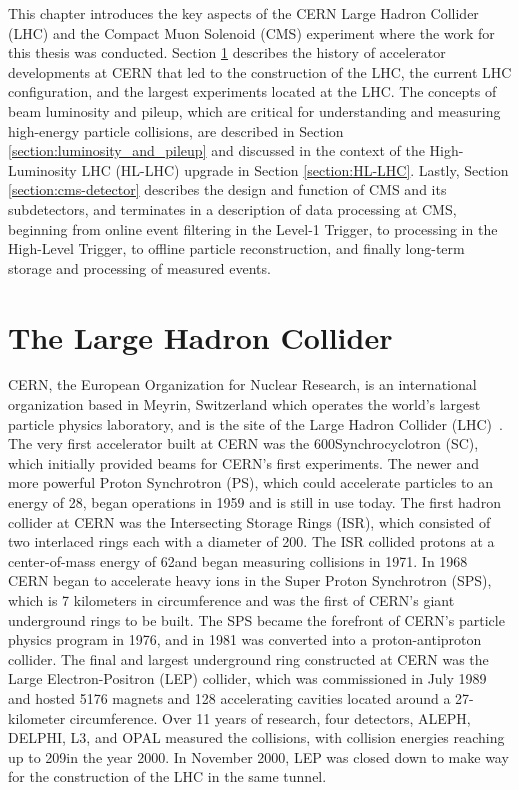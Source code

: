 This chapter introduces the key aspects of the CERN Large Hadron Collider (LHC) and the Compact Muon Solenoid (CMS) experiment where the work for this thesis was conducted. Section \ref{section:LHC} describes the history of accelerator developments at CERN that led to the construction of the LHC, the current LHC configuration, and the largest experiments located at the LHC. The concepts of beam luminosity and pileup, which are critical for understanding and measuring high-energy particle collisions, are described in Section \ref{section:luminosity_and_pileup} and discussed in the context of the High-Luminosity LHC (HL-LHC) upgrade in Section \ref{section:HL-LHC}. Lastly, Section \ref{section:cms-detector} describes the design and function of CMS and its subdetectors, and terminates in a description of data processing at CMS, beginning from online event filtering in the Level-1 Trigger, to processing in the High-Level Trigger, to offline particle reconstruction, and finally long-term storage and processing of measured events.

\section{The Large Hadron Collider}
\label{section:LHC}
CERN, the European Organization for Nuclear Research, is an international organization based in Meyrin, Switzerland which operates the world's largest particle physics laboratory, and is the site of the Large Hadron Collider (LHC)~\cite{history_of_CERN}. The very first accelerator built at CERN was the 600\MeV Synchrocyclotron (SC), which initially provided beams for CERN's first experiments. The newer and more powerful Proton Synchrotron (PS), which could accelerate particles to an energy of 28\GeV, began operations in 1959 and is still in use today. The first hadron collider at CERN was the Intersecting Storage Rings (ISR), which consisted of two interlaced rings each with a diameter of 200. The ISR collided protons at a center-of-mass energy of 62\GeV and began measuring collisions in 1971. In 1968 CERN began to accelerate heavy ions in the Super Proton Synchrotron (SPS), which is 7 kilometers in circumference and was the first of CERN's giant underground rings to be built. The SPS became the forefront of CERN's particle physics program in 1976, and in 1981 was converted into a proton-antiproton collider. The final and largest underground ring constructed at CERN was the Large Electron-Positron (LEP) collider, which was commissioned in July 1989 and hosted 5176 magnets and 128 accelerating cavities located around a 27-kilometer circumference. Over 11 years of research, four detectors, ALEPH, DELPHI, L3, and OPAL measured the collisions, with collision energies reaching up to 209\GeV in the year 2000. In November 2000, LEP was closed down to make way for the construction of the LHC in the same tunnel.

